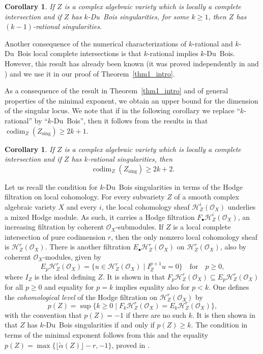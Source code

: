 \documentclass[11pt]{article}
\numberwithin{equation}{section}
\newcommand{\sbullet}{{\scriptscriptstyle\bullet}}
\theoremstyle{plain}
\newtheorem{cor}[thm]{Corollary}
\theoremstyle{definition}
\newcommand\cH{\mathcal{H}}
\newcommand\cO{\mathcal{O}}
\newcommand\cH{\mathcal{H}}
\newcommand\cO{\mathcal{O}}
\newcommand\sing{\mathrm{sing}}
\DeclareMathOperator{\codim}{codim}
\begin{document}
\begin{cor}\label{cor2_intro}
If $Z$ is a complex algebraic variety which is locally a complete intersection and if $Z$ has $k$-Du~Bois singularities, for some $k\geq 1$,
then $Z$ has $(k-1)$-rational singularities.
\end{cor}

Another consequence of the numerical characterizations of $k$-rational and $k$-Du~Bois local complete intersections
is that $k$-rational implies $k$-Du~Bois. However, this result has already been known (it was proved independently in \cite{FL2} and \cite{MP1})
and we use it in our proof of Theorem~\ref{thm1_intro}.

As a consequence of the result in Theorem~\ref{thm1_intro} and of general properties
of the minimal exponent, we obtain an upper bound for the dimension of the singular locus.
We note that if in the following corollary we replace ``$k$-rational'' by ``$k$-Du~Bois'', then it follows from the results in \cite{MP1}
that $\codim_Z(Z_\sing)\geq 2k+1$.

\begin{cor}\label{cor2.5_intro}
If $Z$ is a complex algebraic variety which is locally a complete intersection and if $Z$ has $k$-rational singularities, then
\[\codim_Z(Z_\sing)\geq 2k+2.\]
\end{cor}

Let us recall the condition for $k$-Du~Bois singularities in terms of the Hodge filtration on local cohomology. For every subvariety $Z$
of a smooth complex algebraic variety $X$ and every $i$, the local cohomology sheaf $\cH^i_Z(\cO_X)$ underlies a mixed Hodge module. As such, it carries a
Hodge filtration $F_{\sbullet}\cH^i_Z(\cO_X)$, an increasing filtration by coherent $\cO_X$-submodules. If $Z$ is a local complete intersection of pure codimension $r$,
then the only nonzero local cohomology sheaf is $\cH^r_Z(\cO_X)$. There is another filtration $E_{\sbullet}\cH^r_Z(\cO_X)$ on $\cH^r_Z(\cO_X)$,
also by coherent $\cO_X$-modules,
given by
\[E_p\cH^r_Z(\cO_X)=\big\{u\in \cH^r_Z(\cO_X)\mid I_Z^{p+1}u=0\big\}\quad\text{for}\quad p\geq 0,\]
where $I_Z$ is the ideal defining $Z$. It is shown in \cite{MP1} that $F_p\cH^r_Z(\cO_X)\subseteq E_p\cH^r_Z(\cO_X)$ for all $p\geq 0$
and equality for $p=k$ implies equality also for $p<k$.
One defines the \emph{cohomological level} of the Hodge filtration on $\cH^r_Z(\cO_X)$ by
\[p(Z)=\sup\big\{k\geq 0\mid F_k\cH^r_Z(\cO_X)=E_k\cH^r_Z(\cO_X)\big\},\]
with the convention that $p(Z)=-1$ if there are no such $k$. It is then shown in \cite{MP1} that $Z$ has $k$-Du~Bois singularities
if and only if $p(Z)\geq k$. The condition in terms of the minimal exponent follows from this and the equality
$p(Z)=\max\big\{\lfloor\widetilde{\alpha}(Z)\rfloor-r, -1\big\}$, proved in \cite{CDMO}.
\end{document}

